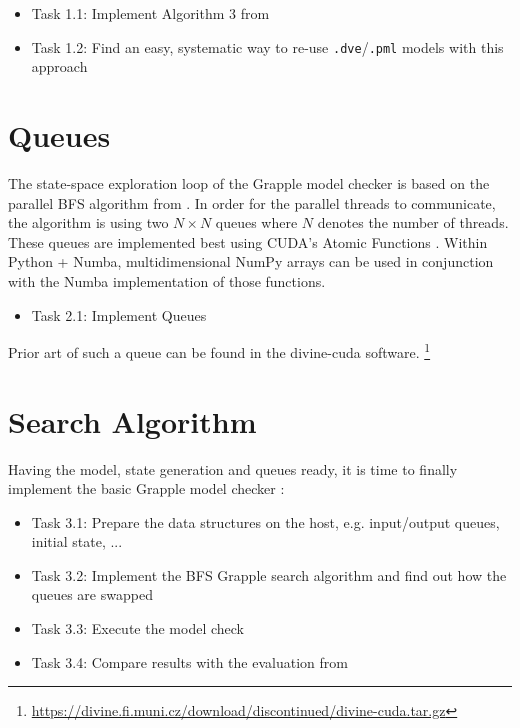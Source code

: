 \documentclass[a4paper]{scrartcl}
\begin{document}
\begin{itemize}
    \item Task 1.1: Implement Algorithm 3 from \cite{Bartocci2014.GPGPU-Parallel-SPIN}
    \item Task 1.2: Find an easy, systematic way to re-use \texttt{.dve}/\texttt{.pml} models with this approach
\end{itemize}


\section{Queues}

The state-space exploration loop of the Grapple model checker is based on the parallel BFS algorithm from \cite{Holzmann2012.Paralellizing-SPIN}.
In order for the parallel threads to communicate, the algorithm is using two $N \times N$ queues where $N$ denotes the number of threads.
These queues are implemented best using CUDA's Atomic Functions \cite{CUDA-CPP-Programming-Guide}.
Within Python + Numba, multidimensional NumPy arrays can be used in conjunction with the Numba implementation \cite{Numba-CUDA-Guide} of those functions.

\begin{itemize}
    \item Task 2.1: Implement Queues
\end{itemize}

Prior art of such a queue can be found in the divine-cuda software. \footnote{\url{https://divine.fi.muni.cz/download/discontinued/divine-cuda.tar.gz}}


\section{Search Algorithm}

Having the model, state generation and queues ready, it is time to finally implement the basic Grapple model checker \cite{DeFrancisco2020.Grapple}:

\begin{itemize}
    \item Task 3.1: Prepare the data structures on the host, e.g. input/output queues, initial state, ...
    \item Task 3.2: Implement the BFS Grapple search algorithm and find out how the queues are swapped
    \item Task 3.3: Execute the model check
    \item Task 3.4: Compare results with the evaluation from \cite{DeFrancisco2020.Grapple}
\end{itemize}
\end{document}

